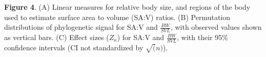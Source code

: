 \documentclass[
]{article}
\begin{document}
\singlespacing \textbf{Figure 4}. (A) Linear measures for relative body
size, and regions of the body used to estimate surface area to volume
(SA:V) ratios. (B) Permutation distributions of phylogenetic signal for
SA:V and \(\frac{BW}{SVL}\), with observed values shown as vertical
bars. (C) Effect sizes (\(Z_\kappa\)) for SA:V and \(\frac{BW}{SVL}\),
with their 95\% confidence intervals (CI not standardized by
\(\sqrt(n)\)).
\end{document}
